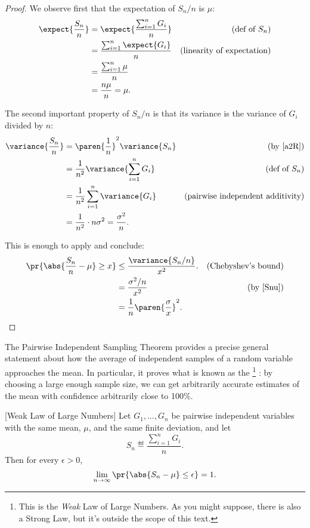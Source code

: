 \begin{proof}
We observe first that the expectation of $S_n/n$ is $\mu$:
\begin{align*}
\expect{\frac{S_n}{n}} & = \expect{\frac{\sum_{i=1}^n G_i}{n}}
         & \text{(def of $S_n$)}\\
 & = \frac{\sum_{i=1}^n \expect{G_i}}{n}
     & \text{(linearity of expectation)}\\
 & = \frac{\sum_{i=1}^n \mu}{n}\\
 & = \frac{n\mu}{n} = \mu.
\end{align*}

The second important property of $S_n/n$ is that its variance is the
variance of $G_i$ divided by $n$:
\begin{align}
\variance{\frac{S_n}{n}} & =  \paren{\frac{1}{n}}^2 \variance{S_n}
          & \mbox{(by~\eqref{a2R})}\notag\\
 & =  \frac{1}{n^2} \variance{\sum_{i=1}^n G_i}
          & \text{(def of $S_n$)}\notag\\
 & =  \frac{1}{n^2} \sum_{i=1}^n \variance{G_i}
        & \text{(pairwise independent additivity)}\notag\\
 & =  \frac{1}{n^2}\cdot n\sigma^2 =  \frac{\sigma^2}{n}.\label{Snu}
\end{align}

This is enough to apply  and conclude:
\begin{align*}
\pr{\abs{\frac{S_n}{n} - \mu} \geq x} & \leq \frac{\variance{S_n/n}}{x^2}.
       & \text{(Chebyshev's bound)}\\
    & = \frac{\sigma^2/n}{x^2} & \text{(by~\eqref{Snu})}\\
    & = \frac{1}{n} \paren{\frac{\sigma}{x}}^2.
\end{align*}

\end{proof}

The Pairwise Independent Sampling Theorem provides a precise general
statement about how the average of independent samples of a random
variable approaches the mean.  In particular, it proves what is known as
the \footnote{This is the  \emph{Weak} Law of Large Numbers.  As you might
  suppose, there is also a Strong Law, but it's outside the scope of
  this text.} : by choosing a large enough sample size, we can get arbitrarily
accurate estimates of the mean with confidence arbitrarily close to 100\%.

\begin{corollary}\label{weaklaw}[Weak Law of Large Numbers]
  Let $G_1, \dots, G_n$ be pairwise independent variables with the same
  mean, $\mu$, and the same finite deviation, and let
\[
S_n \eqdef \frac{\sum_{i=1}^n G_i}{n}.
\]
Then for every $\epsilon > 0$,
\[
\lim_{n \rightarrow \infty}
        \pr{\abs{S_n - \mu}  \leq \epsilon} = 1.
\]
\end{corollary}

